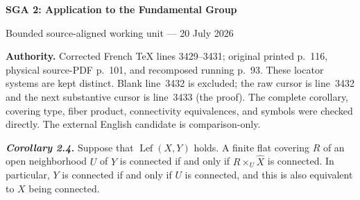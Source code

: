 \documentclass[10pt,a4paper]{article}
\newcommand{\Lefc}{\operatorname{Lef}}
\begin{document}
\begin{center}
  {\Large\bfseries SGA 2: Application to the Fundamental Group}\par\smallskip
  {\large Bounded source-aligned working unit --- 20 July 2026}
\end{center}
\noindent\colorbox{softgray}{\parbox{0.95\linewidth}{\footnotesize\textbf{Authority.}
Corrected French TeX lines 3429--3431; original printed p.~116, physical
source-PDF p.~101, and recomposed running p.~93. These locator systems are
kept distinct. Blank line~3432 is excluded; the raw cursor is line~3432 and
the next substantive cursor is line~3433 (the proof). The complete
corollary, covering type, fiber product, connectivity equivalences, and
symbols were checked directly. The external English candidate is
comparison-only.}}

\medskip
\noindent\textbf{\textit{Corollary 2.4.}}
Suppose that $\Lefc(X,Y)$ holds. A finite flat covering $R$ of an open
neighborhood $U$ of $Y$ is connected if and only if
$R\times_U\widehat X$ is connected. In particular, $Y$ is connected if and
only if $U$ is connected, and this is also equivalent to $X$ being
connected.
\end{document}
